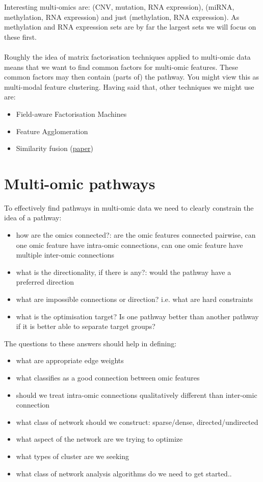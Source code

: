 \documentclass[a4paper,10pt]{article}
\begin{document}
Interesting multi-omics are: (CNV, mutation, RNA expression), (miRNA, methylation, RNA expression) and just (methylation, RNA expression).
As methylation and RNA expression sets are by far the largest sets we will focus on these first. \\ \\
%
Roughly the idea of matrix factorisation techniques applied to multi-omic data means that we want to find
common factors for multi-omic features. These common factors may then contain (parts of) the pathway. 
You might view this as multi-modal feature clustering. Having said that, other techniques we might use are:
\begin{itemize}
\item Field-aware Factorisation Machines
\item Feature Agglomeration
\item Similarity fusion (\href{https://www.researchgate.net/publication/221299518_Unifying_user-based_and_item-based_collaborative_filtering_approaches_by_similarity_fusion}{paper})
\end{itemize}

\section{Multi-omic pathways}
%
To effectively find pathways in multi-omic data we need to clearly constrain the idea of a pathway:
\begin{itemize}
 \item how are the omics connected?: are the omic features connected pairwise, can one omic feature have intra-omic connections, can one omic feature have multiple inter-omic connections
 \item what is the directionality, if there is any?: would the pathway have a preferred direction
 \item what are impossible connections or direction? i.e. what are hard constraints
 \item what is the optimisation target? Is one pathway better than another pathway if it is better able to separate target groups?
\end{itemize}
%

The questions to these answers should help in defining:
\begin{itemize}
 \item what are appropriate edge weights
 \item what classifies as a good connection between omic features
 \item should we treat intra-omic connections qualitatively different than inter-omic connection
 \item what class of network should we construct: sparse/dense, directed/undirected
 \item what aspect of the network are we trying to optimize
 \item what types of cluster are we seeking
 \item what class of network analysis algorithms do we need to get started..
\end{itemize}
\end{document}
